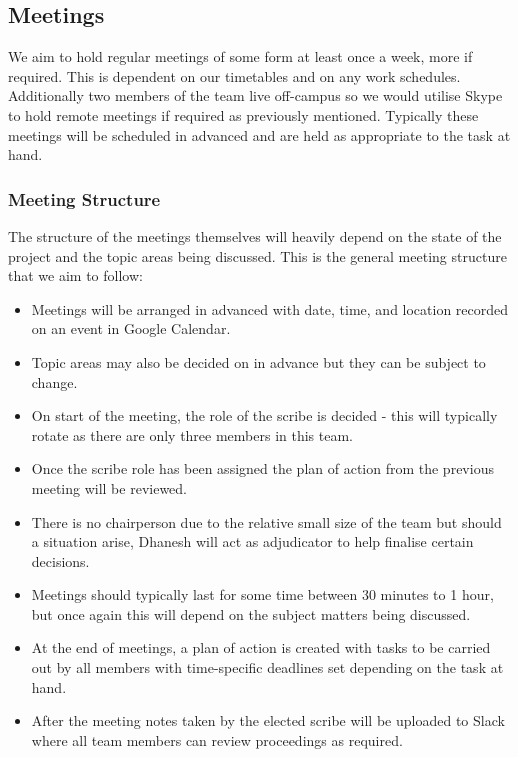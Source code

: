 \documentclass{article}
\begin{document}
\subsection{Meetings}

We aim to hold regular meetings of some form at least once a week, more if required. This is dependent on our timetables and on any work schedules. Additionally two members of the team live off-campus so we would utilise Skype to hold remote meetings if required as previously mentioned. Typically these meetings will be scheduled in advanced and are held as appropriate to the task at hand.

\subsubsection{Meeting Structure}

The structure of the meetings themselves will heavily depend on the state of the project and the topic areas being discussed. This is the general meeting structure that we aim to follow:

\begin{itemize}
    \item Meetings will be arranged in advanced with date, time, and location recorded on an event in Google Calendar.
    \item Topic areas may also be decided on in advance but they can be subject to change.
    \item On start of the meeting, the role of the scribe is decided - this will typically rotate as there are only three members in this team.
    \item Once the scribe role has been assigned the plan of action from the previous meeting will be reviewed.
    \item There is no chairperson due to the relative small size of the team but should a situation arise, Dhanesh will act as adjudicator to help finalise certain decisions.
    \item Meetings should typically last for some time between 30 minutes to 1 hour, but once again this will depend on the subject matters being discussed.
    \item At the end of meetings, a plan of action is created with tasks to be carried out by all members with time-specific deadlines set depending on the task at hand.
    \item After the meeting  notes taken by the elected scribe will be uploaded to Slack where all team members can review proceedings as required.
\end{itemize}
\end{document}

